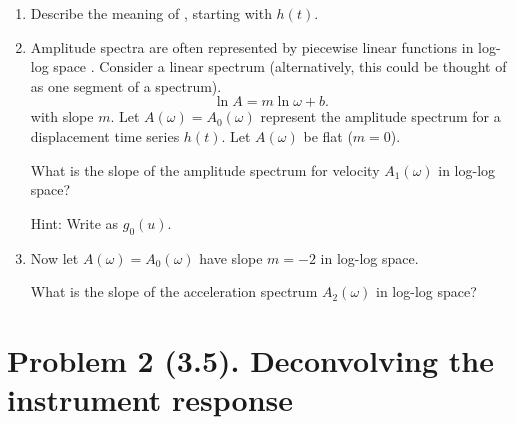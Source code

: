 \documentclass[11pt,titlepage,fleqn]{article}
\newcommand{\fft}{h}
\begin{document}
\begin{enumerate}
\begin{enumerate}
\item Describe the meaning of , starting with $\fft(t)$.

\item Amplitude spectra are often represented by piecewise linear functions in log-log space \citep[\eg][Figs.~6.3-6 and 6.6-8]{SteinWysession}. Consider a linear spectrum (alternatively, this could be thought of as one segment of a spectrum).
%
\begin{equation}
\ln A = m \ln\omega + b.
\label{Alin}
\end{equation}
%
with slope $m$.
Let $A(\omega) = A_0(\omega)$ represent the amplitude spectrum for a displacement time series $\fft(t)$. Let $A(\omega)$ be flat ($m=0$).

What is the slope of the amplitude spectrum for velocity $A_1(\omega)$ in log-log space?

Hint: Write  as $g_0(u)$.

\item Now let $A(\omega) = A_0(\omega)$ have slope $m=-2$ in log-log space.

What is the slope of the acceleration spectrum $A_2(\omega)$ in log-log space?

\end{enumerate}

\end{enumerate}


\section*{Problem 2 (3.5). Deconvolving the instrument response}
\end{document}
